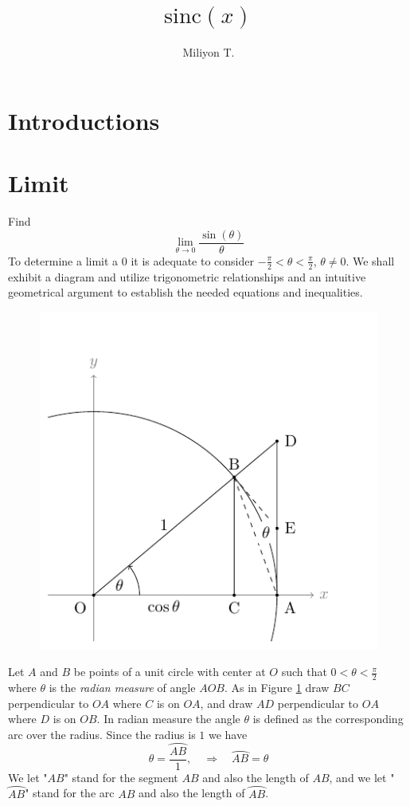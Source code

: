 \documentclass[11pt]{article}
\theoremstyle{definition}
\theoremstyle{plain}
\begin{document}
\clearpage

\title{$\mbox{sinc}(x)$}
\author{Miliyon T.}
\maketitle
\section{Introductions}

\section{Limit}
Find
\[
\lim_{\theta\to 0}\frac{\sin(\theta)}{\theta}
\]
To determine a limit a $0$ it is adequate to consider $-\frac\pi2<\theta<\frac\pi2$, $\theta\neq0$. We shall exhibit a diagram and utilize trigonometric relationships and an intuitive geometrical argument to establish the needed equations and inequalities.
\begin{figure}[hbt!]
\centering
\includegraphics[width=.4\textwidth]{sincx}
\caption{}\label{sinc}
\end{figure}

Let $A$ and $B$ be points of a unit circle with center at $O$ such that $0<\theta<\frac\pi2$ where $\theta$ is the \textit{radian measure} of angle $AOB$. As in Figure \ref{sinc} draw $BC$ perpendicular to $OA$ where $C$ is on $OA$, and draw $AD$ perpendicular to $OA$ where $D$ is on $OB$. In radian measure the angle $\theta$ is defined as the corresponding arc over the radius. Since the radius is $1$ we have
\[
\theta=\frac{\wideparen{AB}}{1},\quad\Rightarrow\quad \wideparen{AB}=\theta
\]
We let "$AB$" stand for the segment $AB$ and also the length of $AB$, and we let "$\wideparen{AB}$" stand for the arc $AB$ and also the length of $\wideparen{AB}$.

\medskip
\end{document}
